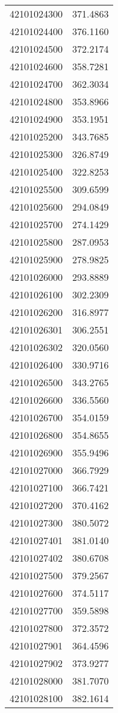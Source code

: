 \begin{longtable}[t]{lr}
42101024300 & 371.4863\\
42101024400 & 376.1160\\
42101024500 & 372.2174\\
42101024600 & 358.7281\\
42101024700 & 362.3034\\
42101024800 & 353.8966\\
42101024900 & 353.1951\\
42101025200 & 343.7685\\
42101025300 & 326.8749\\
42101025400 & 322.8253\\
42101025500 & 309.6599\\
42101025600 & 294.0849\\
42101025700 & 274.1429\\
42101025800 & 287.0953\\
42101025900 & 278.9825\\
42101026000 & 293.8889\\
42101026100 & 302.2309\\
42101026200 & 316.8977\\
42101026301 & 306.2551\\
42101026302 & 320.0560\\
42101026400 & 330.9716\\
42101026500 & 343.2765\\
42101026600 & 336.5560\\
42101026700 & 354.0159\\
42101026800 & 354.8655\\
42101026900 & 355.9496\\
42101027000 & 366.7929\\
42101027100 & 366.7421\\
42101027200 & 370.4162\\
42101027300 & 380.5072\\
42101027401 & 381.0140\\
42101027402 & 380.6708\\
42101027500 & 379.2567\\
42101027600 & 374.5117\\
42101027700 & 359.5898\\
42101027800 & 372.3572\\
42101027901 & 364.4596\\
42101027902 & 373.9277\\
42101028000 & 381.7070\\
42101028100 & 382.1614\\

\end{longtable}
